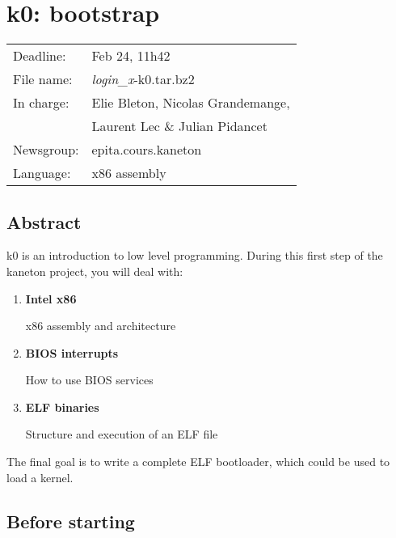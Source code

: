 
%
%

\chapter{k0: bootstrap}

%
%

\begin{tabular}{p{7cm}l}
Deadline: & Feb 24, 11h42 \\
File name: & {\em login\_x}-k0.tar.bz2 \\
In charge: & Elie Bleton, Nicolas Grandemange,\\
        & Laurent Lec \& Julian Pidancet\\
Newsgroup: & epita.cours.kaneton\\
Language: & x86 assembly\\
\end{tabular}

\section{Abstract}

k0 is an introduction to low level programming. During this first step of
the kaneton project, you will deal with:

\begin{enumerate}
  \item
    {\bf Intel x86}

    x86 assembly and architecture
  \item
    {\bf BIOS interrupts}

    How to use BIOS services
  \item
    {\bf ELF binaries}

    Structure and execution of an ELF file
\end{enumerate}

The final goal is to write a complete ELF bootloader, which could be used to
load a kernel.

\clearpage

\section{Before starting}

